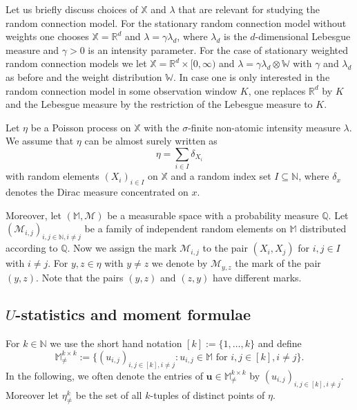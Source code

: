 \documentclass{article}
\theoremstyle{definition}
\numberwithin{equation}{section}
\theoremstyle{remark}
\begin{document}
Let us briefly discuss choices of $\mathbb{X}$ and $\lambda$ that are relevant for studying the random connection model. For the stationary random connection model without weights one chooses $\mathbb{X}=\mathbb{R}^d$ and $\lambda=\gamma\lambda_d$, where $\lambda_d$ is the $d$-dimensional Lebesgue measure and $\gamma>0$ is an intensity parameter. For the case of stationary weighted random connection models we let $\mathbb{X}=\mathbb{R}^d\times [0,\infty)$ and $\lambda=\gamma\lambda_d\otimes \mathbb{W}$ with $\gamma$ and $\lambda_d$ as before and the weight distribution $\mathbb{W}$. In case one is only interested in the random connection model in some observation window $K$, one replaces $\mathbb{R}^d$ by $K$ and the Lebesgue measure by the restriction of the Lebesgue measure to $K$.  

Let $\eta$ be a Poisson process on $\mathbb{X}$ with the $\sigma$-finite non-atomic intensity measure $\lambda$. We assume that $\eta$ can be almost surely written as 
$$
\eta=\sum_{i\in I} \delta_{X_i}
$$
with random elements $(X_i)_{i\in I}$ on $\mathbb{X}$ and a random index set $I\subseteq\mathbb{N}$, where $\delta_x$ denotes the Dirac measure concentrated on $x$. 

Moreover, let $(\mathbb{M},\mathcal{M})$ be a measurable space with a probability measure $\mathbb{Q}$. Let $(\mathcal{M}_{i,j})_{i,j\in\mathbb{N},i\neq j}$ be a family of independent random elements on $\mathbb{M}$ distributed according to $\mathbb{Q}$. Now we assign the mark $\mathcal{M}_{i,j}$ to the pair $(X_i,X_j)$ for $i,j\in I$ with $i\neq j$. For $y,z\in\eta$ with $y\neq z$ we denote by $\mathcal{M}_{y,z}$ the mark of the pair $(y,z)$. Note that the pairs $(y,z)$ and $(z,y)$ have different marks.



\subsection{$U$-statistics and moment formulae}
For $k\in\mathbb{N}$ we use the short hand notation $[k]:=\{1,\ldots,k\}$ and define
$$
\mathbb{M}^{k\times k}_{\neq}:=\{(u_{i,j})_{i,j\in[k],i\neq j}: u_{i,j}\in \mathbb{M} \text{ for } i,j\in[k],i\neq j\}.
$$
In the following, we often denote the entries of $\mathbf{u}\in \mathbb{M}^{k\times k}_{\neq}$ by $(u_{i,j})_{i,j\in[k],i\neq j}$. Moreover let $\eta^k_{\neq}$ be the set of all $k$-tuples of distinct points of $\eta$.
\end{document}
